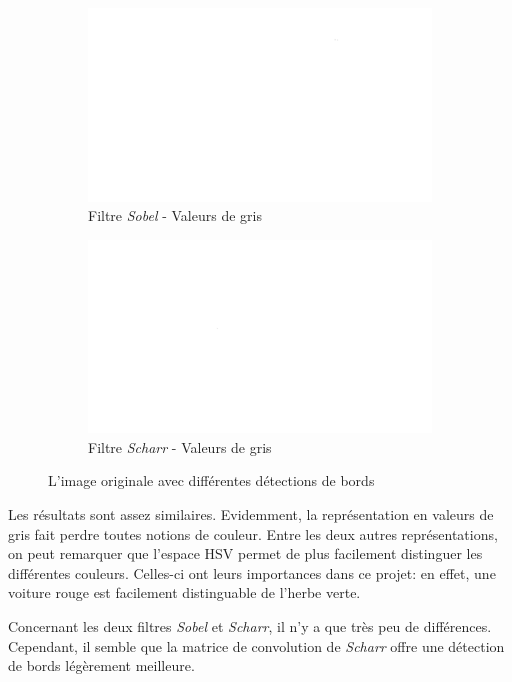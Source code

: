 \begin{figure}[H]
    \bigskip
    \begin{subfigure}{.5\textwidth}
        \centering
        \includegraphics[width=.85\linewidth]{img/conception/image_process/edges_only/2.png}
        \caption{Filtre \textit{Sobel} - Valeurs de gris}
    \end{subfigure}%
    \begin{subfigure}{.5\textwidth}
        \centering
        \includegraphics[width=.85\linewidth]{img/conception/image_process/edges_only/5.png}
        \caption{Filtre \textit{Scharr} - Valeurs de gris}
    \end{subfigure}%
    \centering
    \caption{L'image originale avec différentes détections de bords}
    \label{fig:image_process_edges}
\end{figure}

Les résultats sont assez similaires. Evidemment, la représentation en valeurs de gris fait perdre toutes notions de couleur. Entre les deux autres représentations, on peut remarquer que l'espace HSV permet de plus facilement distinguer les différentes couleurs. Celles-ci ont leurs importances dans ce projet: en effet, une voiture rouge est facilement distinguable de l'herbe verte. 

Concernant les deux filtres \textit{Sobel} et \textit{Scharr}, il n'y a que très peu de différences. Cependant, il semble que la matrice de convolution de \textit{Scharr} offre une détection de bords légèrement meilleure.

